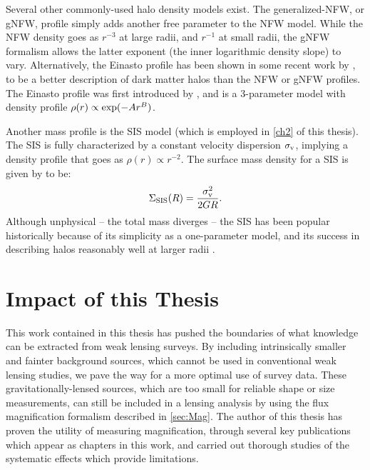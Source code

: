 Several other commonly-used halo density models exist. The generalized-\ac{NFW}, or g\ac{NFW}, profile simply adds another free parameter to the \ac{NFW} model. While the \ac{NFW} density goes as $r^{-3}$ at large radii, and $r^{-1}$ at small radii, the g\ac{NFW} formalism allows the latter exponent (the inner logarithmic density slope) to vary. Alternatively, the Einasto profile has been shown in some recent work by \citet{Dutton14}, to be a better description of dark matter halos than the \ac{NFW} or g\ac{NFW} profiles. The Einasto profile was first introduced by \citet{Einasto65}, and is a 3-parameter model with density profile $\rho(r) \propto {\rm exp}(-Ar^{B})$.

Another mass profile is the \ac{SIS} model (which is employed in \autoref{ch2} of this thesis). The \ac{SIS} is fully characterized by a constant velocity dispersion $\sigma_{\rm v}$, implying a density profile that goes as $\rho(r) \propto r^{-2}$. The surface mass density for a \ac{SIS} is given by \citet{BS01} to be:
\begin{equation}
\Sigma_{\rm SIS}(R) = \frac{\sigma_{\rm v}^2}{2 G R}.
\end{equation}
Although unphysical -- the total mass diverges -- the \ac{SIS} has been popular historically because of its simplicity as a one-parameter model, and its success in describing halos reasonably well at larger radii \citep{Schneider06_WeakGravLens}.

\section{Impact of this Thesis}
\label{sec:Impact}

This work contained in this thesis has pushed the boundaries of what knowledge can be extracted from weak lensing surveys. By including intrinsically smaller and fainter background sources, which cannot be used in conventional weak lensing studies, we pave the way for a more optimal use of survey data. These gravitationally-lensed sources, which are too small for reliable shape or size measurements, can still be included in a lensing analysis by using the flux magnification formalism described in \autoref{sec:Mag}. The author of this thesis has proven the utility of measuring magnification, through several key publications which appear as chapters in this work, and carried out thorough studies of the systematic effects which provide limitations. 

